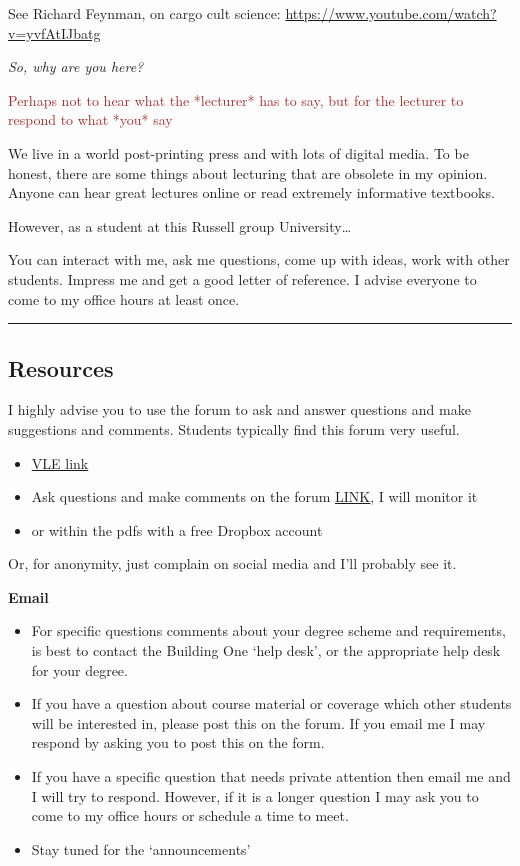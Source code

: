 \documentclass[]{article}
\begin{document}
See Richard Feynman, on cargo cult science: \url{https://www.youtube.com/watch?v=yvfAtIJbatg}

\emph{So, why are you here?}

\textcolor{brown}{Perhaps not to hear what the *lecturer* has to say, but for the lecturer to respond to what *you* say}

We live in a world post-printing press and with lots of digital media. To be honest, there are some things about lecturing that are obsolete in my opinion. Anyone can hear great lectures online or read extremely informative textbooks.

However, as a student at this Russell group University\ldots{}

You can interact with me, ask me questions, come up with ideas, work with other students. Impress me and get a good letter of reference. I advise everyone to come to my office hours at least once.

\begin{center}\rule{0.5\linewidth}{\linethickness}\end{center}

\hypertarget{resources}{%
\subsection{Resources}\label{resources}}

I highly advise you to use the forum to ask and answer questions and make suggestions and comments. Students typically find this forum very useful.

\begin{itemize}
\item
  \href{http://vle.exeter.ac.uk/course/view.php?id=1847}{VLE link}
\item
  Ask questions and make comments on the forum \href{http://vle.exeter.ac.uk/mod/forum/view.php?id=487174}{LINK}, I will monitor it
\item
  or within the pdfs with a free Dropbox account
\end{itemize}

Or, for anonymity, just complain on social media and I'll probably see it.

\textbf{Email}

\begin{itemize}
\item
  For specific questions comments about your degree scheme and requirements, is best to contact the Building One `help desk', or the appropriate help desk for your degree.
\item
  If you have a question about course material or coverage which other students will be interested in, please post this on the forum. If you email me I may respond by asking you to post this on the form.
\item
  If you have a specific question that needs private attention then email me and I will try to respond. However, if it is a longer question I may ask you to come to my office hours or schedule a time to meet.
\item
  Stay tuned for the `announcements'
\end{itemize}
\end{document}
